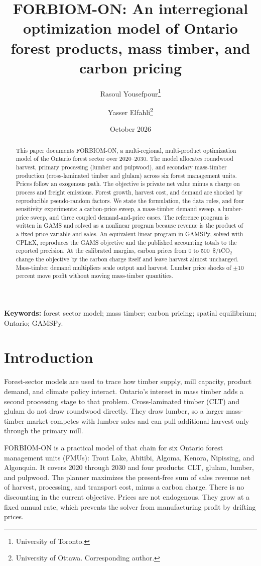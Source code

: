 \documentclass[11pt]{article}
\title{FORBIOM-ON: An interregional optimization model of Ontario forest products, mass timber, and carbon pricing}
\author{%
  Rasoul Yousefpour\thanks{University of Toronto.}
  \and
  Yasser Elfahli\thanks{University of Ottawa. Corresponding author.}
}
\date{October 2026}
\begin{document}
\maketitle

\begin{abstract}
\noindent
This paper documents FORBIOM-ON, a multi-regional, multi-product optimization model of the Ontario forest sector over 2020--2030. The model allocates roundwood harvest, primary processing (lumber and pulpwood), and secondary mass-timber production (cross-laminated timber and glulam) across six forest management units. Prices follow an exogenous path. The objective is private net value minus a charge on process and freight emissions. Forest growth, harvest cost, and demand are shocked by reproducible pseudo-random factors. We state the formulation, the data rules, and four sensitivity experiments: a carbon-price sweep, a mass-timber demand sweep, a lumber-price sweep, and three coupled demand-and-price cases. The reference program is written in GAMS and solved as a nonlinear program because revenue is the product of a fixed price variable and sales. An equivalent linear program in GAMSPy, solved with CPLEX, reproduces the GAMS objective and the published accounting totals to the reported precision. At the calibrated margins, carbon prices from 0 to 500~\$/tCO$_2$ change the objective by the carbon charge itself and leave harvest almost unchanged. Mass-timber demand multipliers scale output and harvest. Lumber price shocks of $\pm 10$ percent move profit without moving mass-timber quantities.
\end{abstract}

\noindent\textbf{Keywords:} forest sector model; mass timber; carbon pricing; spatial equilibrium; Ontario; GAMSPy.

\section{Introduction}

Forest-sector models are used to trace how timber supply, mill capacity, product demand, and climate policy interact. Ontario's interest in mass timber adds a second processing stage to that problem. Cross-laminated timber (CLT) and glulam do not draw roundwood directly. They draw lumber, so a larger mass-timber market competes with lumber sales and can pull additional harvest only through the primary mill.

FORBIOM-ON is a practical model of that chain for six Ontario forest management units (FMUs): Trout Lake, Abitibi, Algoma, Kenora, Nipissing, and Algonquin. It covers 2020 through 2030 and four products: CLT, glulam, lumber, and pulpwood. The planner maximizes the present-free sum of sales revenue net of harvest, processing, and transport cost, minus a carbon charge. There is no discounting in the current objective. Prices are not endogenous. They grow at a fixed annual rate, which prevents the solver from manufacturing profit by drifting prices.
\end{document}
